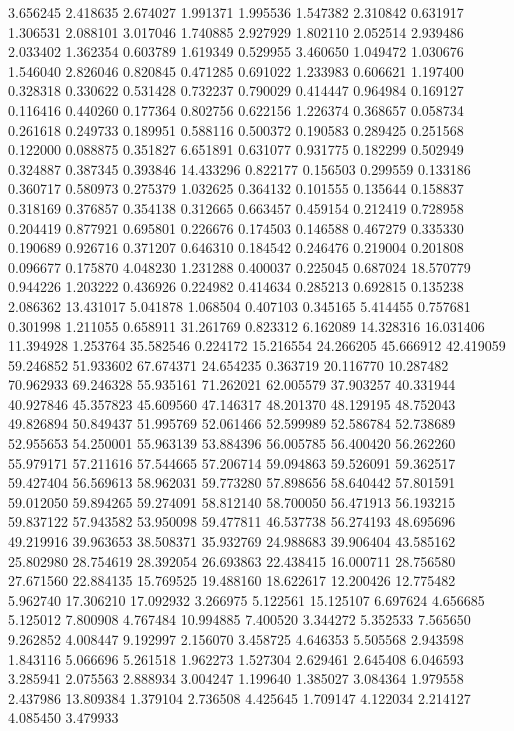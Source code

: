 3.656245
2.418635
2.674027
1.991371
1.995536
1.547382
2.310842
0.631917
1.306531
2.088101
3.017046
1.740885
2.927929
1.802110
2.052514
2.939486
2.033402
1.362354
0.603789
1.619349
0.529955
3.460650
1.049472
1.030676
1.546040
2.826046
0.820845
0.471285
0.691022
1.233983
0.606621
1.197400
0.328318
0.330622
0.531428
0.732237
0.790029
0.414447
0.964984
0.169127
0.116416
0.440260
0.177364
0.802756
0.622156
1.226374
0.368657
0.058734
0.261618
0.249733
0.189951
0.588116
0.500372
0.190583
0.289425
0.251568
0.122000
0.088875
0.351827
6.651891
0.631077
0.931775
0.182299
0.502949
0.324887
0.387345
0.393846
14.433296
0.822177
0.156503
0.299559
0.133186
0.360717
0.580973
0.275379
1.032625
0.364132
0.101555
0.135644
0.158837
0.318169
0.376857
0.354138
0.312665
0.663457
0.459154
0.212419
0.728958
0.204419
0.877921
0.695801
0.226676
0.174503
0.146588
0.467279
0.335330
0.190689
0.926716
0.371207
0.646310
0.184542
0.246476
0.219004
0.201808
0.096677
0.175870
4.048230
1.231288
0.400037
0.225045
0.687024
18.570779
0.944226
1.203222
0.436926
0.224982
0.414634
0.285213
0.692815
0.135238
2.086362
13.431017
5.041878
1.068504
0.407103
0.345165
5.414455
0.757681
0.301998
1.211055
0.658911
31.261769
0.823312
6.162089
14.328316
16.031406
11.394928
1.253764
35.582546
0.224172
15.216554
24.266205
45.666912
42.419059
59.246852
51.933602
67.674371
24.654235
0.363719
20.116770
10.287482
70.962933
69.246328
55.935161
71.262021
62.005579
37.903257
40.331944
40.927846
45.357823
45.609560
47.146317
48.201370
48.129195
48.752043
49.826894
50.849437
51.995769
52.061466
52.599989
52.586784
52.738689
52.955653
54.250001
55.963139
53.884396
56.005785
56.400420
56.262260
55.979171
57.211616
57.544665
57.206714
59.094863
59.526091
59.362517
59.427404
56.569613
58.962031
59.773280
57.898656
58.640442
57.801591
59.012050
59.894265
59.274091
58.812140
58.700050
56.471913
56.193215
59.837122
57.943582
53.950098
59.477811
46.537738
56.274193
48.695696
49.219916
39.963653
38.508371
35.932769
24.988683
39.906404
43.585162
25.802980
28.754619
28.392054
26.693863
22.438415
16.000711
28.756580
27.671560
22.884135
15.769525
19.488160
18.622617
12.200426
12.775482
5.962740
17.306210
17.092932
3.266975
5.122561
15.125107
6.697624
4.656685
5.125012
7.800908
4.767484
10.994885
7.400520
3.344272
5.352533
7.565650
9.262852
4.008447
9.192997
2.156070
3.458725
4.646353
5.505568
2.943598
1.843116
5.066696
5.261518
1.962273
1.527304
2.629461
2.645408
6.046593
3.285941
2.075563
2.888934
3.004247
1.199640
1.385027
3.084364
1.979558
2.437986
13.809384
1.379104
2.736508
4.425645
1.709147
4.122034
2.214127
4.085450
3.479933
